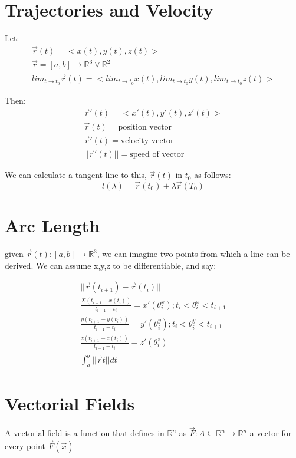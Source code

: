 \documentclass[11pt,fleqn]{book} %
\begin{document}
\section{Trajectories and Velocity}
Let:
\begin{gather}
    \vec{r}(t) = <x(t), y(t), z(t)>\\
    \vec{r} = [a,b] \to \mathbb{R}^3 \lor \mathbb{R}^2  \\
    lim_{t \to t_0} \vec{r}(t) = <lim_{t \to t_0}x(t), lim_{t \to t_0}y(t), lim_{t \to t_0}z(t)>
\end{gather}

Then:
\begin{gather}
    \vec{r}'(t) =  <x'(t), y'(t), z'(t)>\\
    \vec{r}(t) = \text{position vector}\\
    \vec{r}'(t) = \text{velocity vector}\\
    ||\vec{r}'(t)||=\text{speed of vector}
\end{gather}

We can calculate a tangent line to this, $\vec{r}(t)$ in $t_0$ as follows:
\begin{equation}
    l(\lambda) = \vec{r}(t_0) + \lambda \vec{r}(T_0)
\end{equation}

\section{Arc Length}
given $\vec{r}(t): [a,b] \to \mathbb{R}^3$, we can imagine two points from which a line can be derived.
We can assume x,y,z to be differentiable, and say:

\begin{gather}
    ||\vec{r}(t_{i+1}) - \vec{r}(t_{i}) ||\\
    \frac{X(t_{i+1} - x(t_i))}{t_{i+1} - t_i} = x' (\theta_i^x); t_i < \theta_i^x < t_{i+1}\\
    \frac{y(t_{i+1} - y(t_i))}{t_{i+1} - t_i} = y' (\theta_i^y); t_i < \theta_i^y < t_{i+1}\\
    \frac{z(t_{i+1} - z(t_i))}{t_{i+1} - t_i} = z' (\theta_i^z)\\
    \int_{a}^{b} ||\vec{r}t||dt
\end{gather}

\section{Vectorial Fields}

A vectorial field is a function that defines in $\mathbb{R}^n$ as $\vec{F}: A \subseteq \mathbb{R}^n \to \mathbb{R}^n$
a vector for every point $\vec{F}(\vec{x})$
\end{document}
